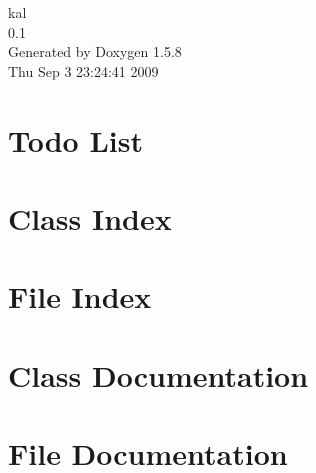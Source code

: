 \documentclass[a4paper]{book}
\begin{document}
\begin{titlepage}
\vspace*{7cm}
\begin{center}
{\Large kal \\[1ex]\large 0.1 }\\
\vspace*{1cm}
{\large Generated by Doxygen 1.5.8}\\
\vspace*{0.5cm}
{\small Thu Sep 3 23:24:41 2009}\\
\end{center}
\end{titlepage}
\clearemptydoublepage
{}
\tableofcontents
\clearemptydoublepage
{}
\chapter{Todo List}
\label{todo}
\hypertarget{todo}{}

\chapter{Class Index}

\chapter{File Index}

\chapter{Class Documentation}










\chapter{File Documentation}

















\printindex
\end{document}

